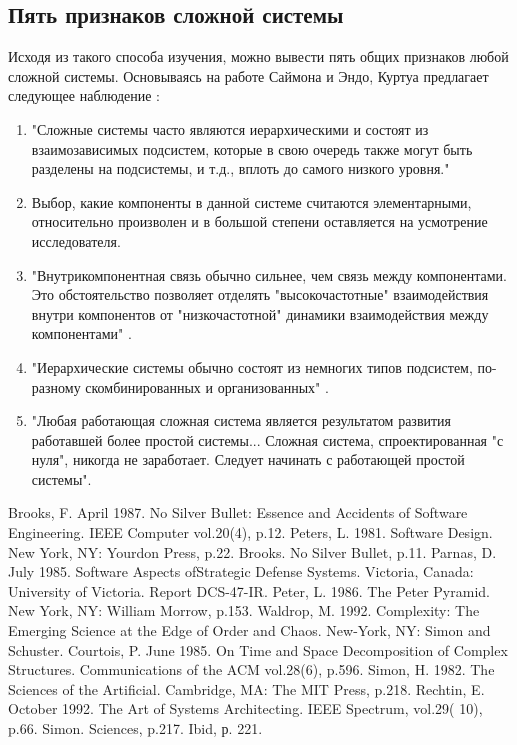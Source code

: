 \documentclass[10pt]{article}
\begin{document}
\subsection{Пять признаков сложной системы}
Исходя из такого способа изучения, можно вывести пять общих признаков любой сложной системы. Основываясь на работе Саймона и Эндо, Куртуа предлагает следующее наблюдение \cite{Courtois}: 
\begin{enumerate}
\it
\item "Сложные системы часто являются иерархическими и состоят из взаимозависимых подсистем, которые в свою очередь также могут быть разделены на подсистемы, и т.д., вплоть до самого низкого уровня."
\item Выбор, какие компоненты в данной системе считаются элементарными, относительно произволен и в большой степени оставляется на усмотрение исследователя.
\item "Внутрикомпонентная связь обычно сильнее, чем связь между компонентами. Это обстоятельство позволяет отделять "высокочастотные" взаимодействия внутри компонентов от "низкочастотной" динамики взаимодействия между компонентами" \cite{Sciences}. 
\item "Иерархические системы обычно состоят из немногих типов подсистем, по-разному скомбинированных и организованных" \cite{Ibid}.
\item "Любая работающая сложная система является результатом развития работавшей более простой системы... Сложная система, спроектированная "с нуля", никогда не заработает. Следует начинать с работающей простой системы".
\rm
\end{enumerate}

\begin{thebibliography}{0}
 Brooks, F. April 1987. No Silver Bullet: Essence and Accidents of Software Engineering. IEEE Computer vol.20(4), p.12. 
 Peters, L. 1981. Software Design. New York, NY: Yourdon Press, p.22. 
 Brooks. No Silver Bullet, p.11. 
 Parnas, D. July 1985. Software Aspects ofStrategic Defense Systems. Victoria, Canada: University of Victoria. Report DCS-47-IR. 
 Peter, L. 1986. The Peter Pyramid. New York, NY: William Morrow, p.153. 
 Waldrop, M. 1992. Complexity: The Emerging Science at the Edge of Order and Chaos. New-York, NY: Simon and Schuster. 
 Courtois, P. June 1985. On Time and Space Decomposition of Complex Structures. Communications of the ACM vol.28(6), p.596. 
 Simon, H. 1982. The Sciences of the Artificial. Cambridge, MA: The MIT Press, p.218. 
 Rechtin, E. October 1992. The Art of Systems Architecting. IEEE Spectrum, vol.29( 10), p.66. 
 Simon. Sciences, p.217. 
 Ibid, р. 221. 
\end{thebibliography}
\end{document}
